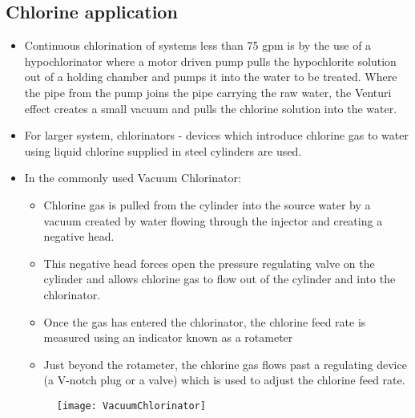 \subsection{Chlorine application}
\begin{itemize}
\item Continuous chlorination of systems less than 75 gpm is by the use of a hypochlorinator where a motor driven pump pulls the hypochlorite solution out of a holding chamber and pumps it into the water to be treated.  Where the pipe from the pump joins the pipe carrying the raw water, the Venturi effect creates a small vacuum and pulls the chlorine solution into the water.
\item For larger system, chlorinators - devices which introduce chlorine gas to water using liquid chlorine supplied in steel cylinders are used.
\item In the commonly used Vacuum Chlorinator:
\begin{itemize}
\item Chlorine gas is pulled from the cylinder into the source water by a vacuum created by water flowing through the injector and creating a negative head. 
\item This negative head forces open the pressure regulating valve on the cylinder and allows chlorine gas to flow out of the cylinder and into the chlorinator.
\item Once the gas has entered the chlorinator, the chlorine feed rate is measured using an indicator known as a rotameter
\item Just beyond the rotameter, the chlorine gas flows past a regulating device (a V-notch plug or a valve) which is used to adjust the chlorine feed rate.
\end{itemize}
\begin{figure}[h]
\begin{center}
\texttt{[image: VacuumChlorinator]}\\
\end{center}
\end{figure}
\end{itemize}
\vspace{-2em}
